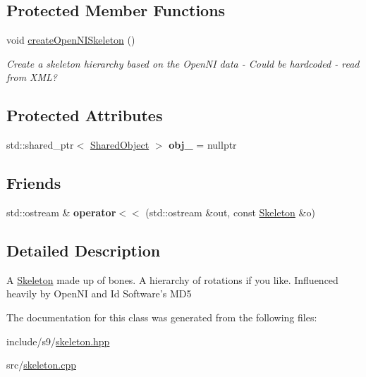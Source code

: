 \subsection*{Protected Member Functions}
\begin{DoxyCompactItemize}
\item 
\hypertarget{classs9_1_1Skeleton_aed798fad3e2c0baabb422cab259490a8}{void \hyperlink{classs9_1_1Skeleton_aed798fad3e2c0baabb422cab259490a8}{create\-Open\-N\-I\-Skeleton} ()}\label{classs9_1_1Skeleton_aed798fad3e2c0baabb422cab259490a8}

\begin{DoxyCompactList}\small\item\em Create a skeleton hierarchy based on the Open\-N\-I data -\/ Could be hardcoded -\/ read from X\-M\-L? \end{DoxyCompactList}\end{DoxyCompactItemize}
\subsection*{Protected Attributes}
\begin{DoxyCompactItemize}
\item 
\hypertarget{classs9_1_1Skeleton_a5c40715a00d134ba679ecc5409e41d8d}{std\-::shared\-\_\-ptr$<$ \hyperlink{structs9_1_1Skeleton_1_1SharedObject}{Shared\-Object} $>$ {\bfseries obj\-\_\-} = nullptr}\label{classs9_1_1Skeleton_a5c40715a00d134ba679ecc5409e41d8d}

\end{DoxyCompactItemize}
\subsection*{Friends}
\begin{DoxyCompactItemize}
\item 
\hypertarget{classs9_1_1Skeleton_a8cfbeb3a605ae9a98ab70cb571111b13}{std\-::ostream \& {\bfseries operator$<$$<$} (std\-::ostream \&out, const \hyperlink{classs9_1_1Skeleton}{Skeleton} \&o)}\label{classs9_1_1Skeleton_a8cfbeb3a605ae9a98ab70cb571111b13}

\end{DoxyCompactItemize}


\subsection{Detailed Description}
A \hyperlink{classs9_1_1Skeleton}{Skeleton} made up of bones. A hierarchy of rotations if you like. Influenced heavily by Open\-N\-I and Id Software's M\-D5 

The documentation for this class was generated from the following files\-:\begin{DoxyCompactItemize}
\item 
include/s9/\hyperlink{skeleton_8hpp}{skeleton.\-hpp}\item 
src/\hyperlink{skeleton_8cpp}{skeleton.\-cpp}\end{DoxyCompactItemize}
